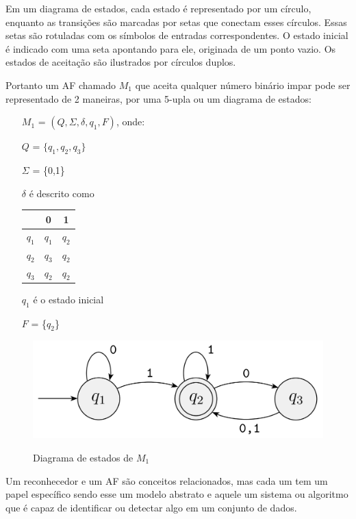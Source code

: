 Em um diagrama de estados, cada estado é representado por um círculo, enquanto as transições são marcadas por setas que conectam esses círculos. Essas setas são rotuladas com os símbolos de entradas correspondentes. O estado inicial é indicado com uma seta apontando para ele, originada de um ponto vazio. Os estados de aceitação são ilustrados por círculos duplos.

Portanto um \ac{AF} chamado $M_1$ que aceita qualquer número binário impar pode ser representado de 2 maneiras,  por uma 5-upla ou um diagrama de estados:

\begin{itemize}
    \item[$M_1$] = $(Q, \Sigma, \delta, q_1, F)$, onde:
    \item[$Q$] = $\{q_1, q_2, q_3\}$
    \item[$\Sigma$] = \{0,1\}
    \item [$\delta$] é descrito como
    \item [ ]
        \begin{tabular}{c|cc}
            & 0 & 1 \\ \hline
            $q_1$ & $q_1$ & $q_2$ \\
            $q_2$ & $q_3$ & $q_2$ \\
            $q_3$ & $q_2$ & $q_2$ \\
        \end{tabular}
    \item[$q_1$] é o estado inicial
    \item[$F$] = \{$q_2$\}
\end{itemize}

\begin{figure}[!htb]
	\centering
    \caption{Diagrama de estados de $M_1$}
	\includegraphics[scale=1]{figuras/AFD/m1.png}
	\label{fig:Diagrama de estados}
\end{figure}

Um reconhecedor e um \ac{AF} são conceitos relacionados, mas cada um tem um papel específico sendo esse um modelo abstrato e aquele um sistema ou algoritmo que é capaz de identificar ou detectar algo em um conjunto de dados.
